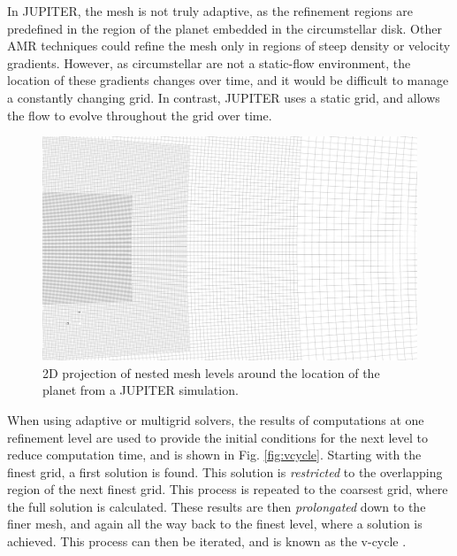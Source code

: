 \documentclass[preprint2]{aastex62}
\begin{document}
In JUPITER, the mesh is not truly adaptive, as the refinement regions are predefined in the region of the planet embedded in the circumstellar disk.
Other AMR techniques could refine the mesh only in regions of steep density or velocity gradients. 
However, as circumstellar are not a static-flow environment, the location of these gradients changes over time, and it would be difficult to manage a constantly changing grid. 
In contrast, JUPITER uses a static grid, and allows the flow to evolve throughout the grid over time.
\begin{figure}[t]
	\includegraphics[width=\linewidth]{figures/Presentation/meshface.png}
	\caption{\label{fig:mesh}2D projection of nested mesh levels around the location of the planet from a JUPITER simulation.}
\end{figure}

When using adaptive or multigrid solvers, the results of computations at one refinement level are used to provide the initial conditions for the next level to reduce computation time, and is shown in Fig. \ref{fig:vcycle}. 
Starting with the finest grid, a first solution is found. 
This solution is \textit{restricted} to the overlapping region of the next finest grid. 
This process is repeated to the coarsest grid, where the full solution is calculated.
These results are then \textit{prolongated} down to the finer mesh, and again all the way back to the finest level, where a solution is achieved. 
This process can then be iterated, and is known as the v-cycle \cite{hockney1988computer}.
\end{document}
